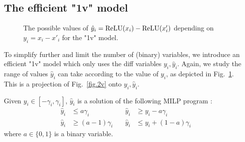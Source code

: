 	\subsection{The efficient "1v" model}

		\begin{figure}[t!]
		\centering
	\hspace*{10ex}
\caption{The possible values of $\hat{y}_i=\mathrm{ReLU}(x_i)-\mathrm{ReLU}(x'_i)$ depending on $y_i = x_i-x'_i$ for the "1v" model.}
	\label{fig.1v}
\end{figure}



	To simplify further and limit the number of (binary) variables, 
    we introduce an efficient "1v" model which only uses the diff variables $y_i,\hat{y}_i$. Again, we study the range of values $\hat{y}_i$ can take according to the value of $y_i$, as depicted in Fig.~\ref{fig.1v}. This is a projection of Fig.~\ref{fig.2v} onto $y_i,\hat{y}_i$.
    


    \begin{proposition}
    \label{prop3}
    Given $y_i \in [-\gamma_i,\gamma_i]$, 
    $\hat{y}_i$ is a solution of the following MILP program :\begin{align*}
		\hat{y}_i &\leq a \gamma_i               &\quad \hat{y}_i &\geq y_i - a \gamma_i \\
		\hat{y}_i &\geq (a-1) \gamma_i           &\quad \hat{y}_i &\leq y_i + (1-a) \gamma_i
	\end{align*} where $a \in \{0,1\}$ is a binary variable.
	\end{proposition}

